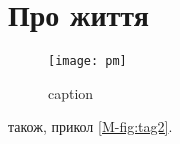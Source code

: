 \documentclass[../../document]{subfiles}
\begin{document}
	\chapter{Про життя}
	\blindtext[2]

	\begin{figure}[H]
		\centering
		\texttt{[image: pm]}
		\caption{caption}
		\label{fig:tag1}
	\end{figure}

	також, прикол \ref{M-fig:tag2}.
\end{document}
